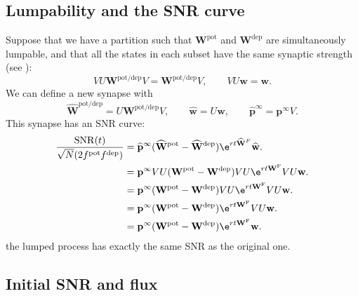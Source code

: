 \documentclass{article} %
\DeclareMathOperator{\SNR}{SNR}
\newcommand{\pr}{\mathbf{p}}
\newcommand{\eq}{\pr^\infty}
\newcommand{\w}{\mathbf{w}}
\newcommand{\W}{\mathbf{W}}
\newcommand{\frg}{\W^{\mathrm{F}}}
\newcommand{\pot}{^{\text{pot}}}
\newcommand{\dep}{^{\text{dep}}}
\newcommand{\potdep}{^{\text{pot/dep}}}
\begin{document}
\subsection{Lumpability and the SNR curve}\label{sec:SNRlump}

Suppose that we have a partition such that $\W\pot $ and $\W\dep $ are simultaneously lumpable, and that all the states in each subset have the same synaptic strength (see ):
%
\begin{equation}\label{eq:lumpablesynapse}
  VU\W\potdep  V = \W\potdep  V,
  \qquad
  VU\w=\w.
\end{equation}
%
We can define a new synapse with
%
\begin{equation}\label{eq:lumpedsynapse}
  \widehat{\W}\potdep  = U\W\potdep  V,
  \qquad
  \widehat{\w} = U \w,
  \qquad
  \widehat{\mathbf{p}}^\infty = \eq V.
\end{equation}
%
This synapse has an SNR curve:
%
\begin{equation}\label{eq:lumpedSNR}
  \begin{aligned}
    \frac{\SNR(t)}{\sqrt{N} (2f\pot f\dep )} &=  \widehat{\mathbf{p}}^\infty (\widehat{\W}\pot  - \widehat{\W}\dep )\e^{rt\widehat{\W}^F}\widehat{\w}. \\
      &= \eq VU (\W\pot  - \W\dep ) VU \e^{rt\frg} VU \w. \\
      &= \eq (\W\pot  - \W\dep ) VU \e^{rt\frg} VU \w. \\
      &= \eq (\W\pot  - \W\dep )\e^{rt\frg} VU \w. \\
      &= \eq (\W\pot  - \W\dep )\e^{rt\frg}\w. \\
  \end{aligned}
\end{equation}
%
\ie the lumped process has exactly the same SNR as the original one.


\subsection{Initial SNR and flux}\label{sec:initflux}
\end{document}
